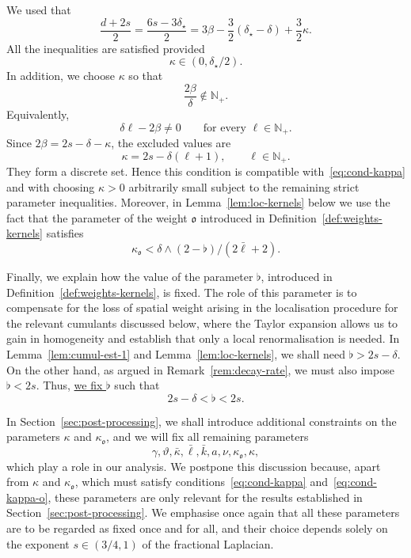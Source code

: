 \documentclass{article}
\numberwithin{equation}{section}
\theoremstyle{plain}
\theoremstyle{definition}
\begin{document}
We used that
\begin{equation}
  \frac{d + 2 s}{2} = \frac{6 s - 3 \delta_{\star}}{2} = 3 \beta - \frac{3}{2}
  (\delta_{\star} - \delta) + \frac32 \kappa . \label{eq:dplustwos}
\end{equation}
All the inequalities are satisfied provided
\begin{equation}
  \kappa \in (0, \delta_{\star} / 2) . \label{eq:cond-kappa}
\end{equation}
In addition, we choose $\kappa$ so that
\begin{equation}
  \frac{2 \beta}{\delta} \notin \mathbb{N}_+ .
  \label{eq:no-marginal-cumulants}
\end{equation}
Equivalently,
\[
  \delta \ell - 2 \beta \neq 0
  \qquad \text{for every } \ell \in \mathbb{N}_+ .
\]
Since $2 \beta = 2 s - \delta - \kappa$, the excluded values are
\[
  \kappa = 2 s - \delta (\ell + 1),
  \qquad \ell \in \mathbb{N}_+ .
\]
They form a discrete set. Hence this condition is compatible
with~\eqref{eq:cond-kappa} and with choosing $\kappa > 0$ arbitrarily small
subject to the remaining strict parameter inequalities.
Moreover, in Lemma~\ref{lem:loc-kernels} below we use the fact that the
parameter of the weight $\mathfrak{o}$ introduced in
Definition~\ref{def:weights-kernels} satisfies
\begin{equation}
  \kappa_{\mathfrak{o}} < \delta \wedge (2 - \flat) / (2 \bar{\ell} + 2) .
  \label{eq:cond-kappa-o}
\end{equation}

Finally, we explain how the value of the parameter $\flat$, introduced in
Definition~\ref{def:weights-kernels}, is fixed. The role of this parameter is to
compensate for the loss of spatial weight arising in the localisation
procedure for the relevant cumulants discussed below, where the Taylor
expansion allows us to gain in homogeneity and establish that only a local
renormalisation is needed. In Lemma~\ref{lem:cumul-est-1} and
Lemma~\ref{lem:loc-kernels}, we shall need $\flat > 2 s - \delta$. On the
other hand, as argued in Remark~\ref{rem:decay-rate}, we must also impose
$\flat < 2 s$. Thus, {\underline{we fix $\flat$}} such that
\begin{equation}
  2 s - \delta < \flat < 2 s. \label{eq:choice-of-flat} 
\end{equation}


In Section~\ref{sec:post-processing}, we shall introduce additional constraints
on the parameters $\kappa$ and $\kappa_{\mathfrak{o}}$, and we will fix all
remaining parameters
\[ \gamma, \vartheta, \bar{\kappa}, \bar{\ell}, \bar{k}, a, \nu,
   \kappa_{\mathfrak{o}}, \kappa, \]
which play a role in our analysis. We postpone this discussion because, apart
from $\kappa$ and $\kappa_{\mathfrak{o}}$, which must satisfy
conditions~\eqref{eq:cond-kappa} and~\eqref{eq:cond-kappa-o}, these parameters
are only relevant for the results established in
Section~\ref{sec:post-processing}. We emphasise once again that all these
parameters are to be regarded as fixed once and for all, and their choice
depends solely on the exponent $s \in (3 / 4, 1)$ of the fractional
Laplacian.
\end{document}
